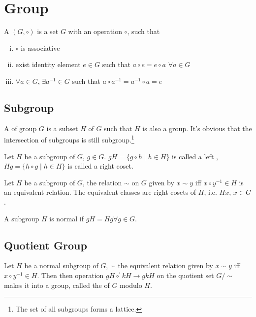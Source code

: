 \section{Group}

\begin{defi}[group]
A  $(G, \circ)$ is a set $G$ with an operation $\circ$, such that
\begin{enumerate}[i).]
\item $\circ$ is associative
\item exist identity element $e \in G$ such that $a \circ e = e \circ a$ $\forall a \in G$
\item $\forall a \in G$, $\exists a^{-1} \in G$ such that $a \circ a^{-1} = a^{-1} \circ a = e$
\end{enumerate}
\end{defi}

\subsection{Subgroup}
A  of group $G$ is a subset $H$ of $G$ such that $H$ is also a group.
It's obvious that the intersection of subgroups is still subgroup.\footnote{The set of all subgroups forms a lattice.}

\begin{defi}[coset]
Let $H$ be a subgroup of $G$, $g \in G$.
$gH = \{g \circ h \mid h \in H\}$ is called a left ,
$Hg = \{h \circ g \mid h \in H\}$ is called a right coset.
\end{defi}

\begin{pro}
Let $H$ be a subgroup of $G$, the relation $\sim$ on $G$ given by $x \sim y$ iff
$x \circ y^{-1} \in H$ is an equivalent relation. 
The equivalent classes are right cosets of $H$, i.e. $Hx$, $x \in G$.
\end{pro}

\begin{defi}
A subgroup $H$ is normal if $gH = Hg \forall g \in G$.
\end{defi}

\subsection{Quotient Group}
\begin{defi}[quotient]
Let $H$ be a normal subgroup of $G$, $\sim$ the equivalent relation given by
$x \sim y$ iff $x \circ y^{-1} \in H$. Then then operation 
$gH \circ^\prime kH \to gk H$ on the quotient set $G / \sim$ makes it into a group, 
called the  of $G$ modulo $H$.
\end{defi}

